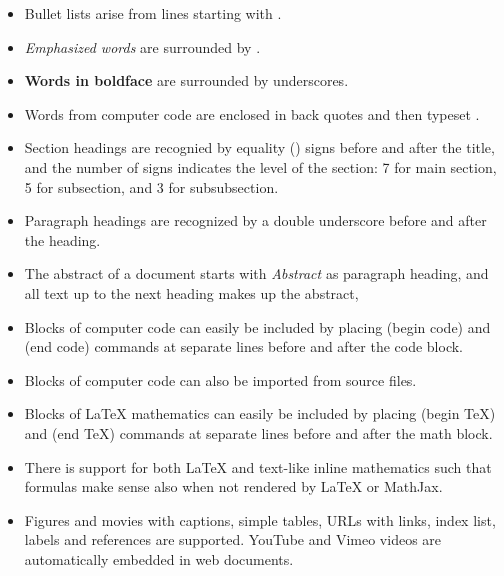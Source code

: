 \documentclass[%
oneside,                 %
final,                   %
10pt]{article}
\begin{document}
\begin{itemize}
  \item Bullet lists arise from lines starting with \code{*}.

  \item \emph{Emphasized words} are surrounded by \code{*}.

  \item \textbf{Words in boldface} are surrounded by underscores.

  \item Words from computer code are enclosed in back quotes and
    then typeset .

  \item Section headings are recognied by equality (\code{=}) signs before
    and after the title, and the number of \code{=} signs indicates the
    level of the section: 7 for main section, 5 for subsection, and
    3 for subsubsection.

  \item Paragraph headings are recognized by a double underscore
    before and after the heading.

  \item The abstract of a document starts with \emph{Abstract} as paragraph
    heading, and all text up to the next heading makes up the abstract,

  \item Blocks of computer code can easily be included by placing
     (begin code) and  (end code) commands at separate lines
    before and after the code block.

  \item Blocks of computer code can also be imported from source files.

  \item Blocks of {\LaTeX} mathematics can easily be included by placing
     (begin TeX) and  (end TeX) commands at separate lines
    before and after the math block.

  \item There is support for both {\LaTeX} and text-like inline mathematics
    such that formulas make sense also when not rendered by {\LaTeX}
    or MathJax.

  \item Figures and movies with captions, simple tables,
    URLs with links, index list, labels and references are supported.
    YouTube and Vimeo videos are automatically embedded in web documents.


\end{itemize}
\end{document}
